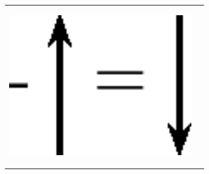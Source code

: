         \begin{center}
      
      \label{m38813*id188904}
      
    \noindent
      \tablelasttail{}
      \begin{xtabular*}{\mytablewidth}[t]{|p{10\mystarwidth}|p{10\mystarwidth}|}\hline
    
    
        
                  
    \setcounter{subfigure}{0}

\label{m38813*id188912}
    \begin{center}
    \label{m38813*id188912!!!underscore!!!media}\label{m38813*id188912!!!underscore!!!printimage}\includegraphics[width=300px]{col11305.imgs/m38813_PG11C1_033.png} %
        
      \vspace{2pt}
    \vspace{.1in}
    
    \end{center}



    \addtocounter{footnote}{-0}
    
                 &
    
    
        
                  
    \setcounter{subfigure}{0}


\end{xtabular*}
\end{center}

